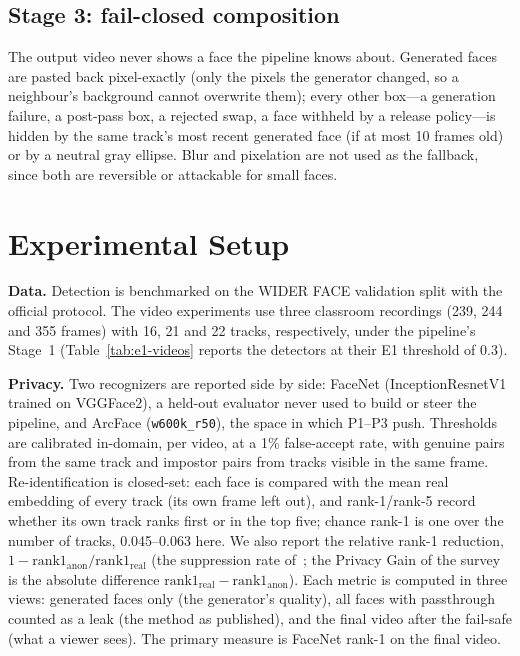 \subsection{Stage 3: fail-closed composition}

The output video never shows a face the pipeline knows about. Generated faces
are pasted back pixel-exactly (only the pixels the generator changed, so a
neighbour's background cannot overwrite them); every other box---a generation
failure, a post-pass box, a rejected swap, a face withheld by a release
policy---is hidden by the same track's most recent generated face (if at most 10
frames old) or by a neutral gray ellipse. Blur and pixelation are not used as
the fallback, since both are reversible or attackable for small faces.

\section{Experimental Setup}

\textbf{Data.} Detection is benchmarked on the WIDER FACE validation split with
the official protocol. The video experiments use three classroom recordings
(239, 244 and 355 frames) with 16, 21 and 22 tracks, respectively, under the
pipeline's Stage~1 (Table~\ref{tab:e1-videos} reports the detectors at their
E1 threshold of 0.3).

\textbf{Privacy.} Two recognizers are reported side by side: FaceNet
(InceptionResnetV1 trained on VGGFace2), a held-out evaluator never used to
build or steer the pipeline, and ArcFace (\texttt{w600k\_r50}), the space in
which P1--P3 push. Thresholds are calibrated in-domain, per video, at a 1\%
false-accept rate, with genuine pairs from the same track and impostor pairs
from tracks visible in the same frame. Re-identification is closed-set: each
face is compared with the mean real embedding of every track (its own frame
left out), and rank-1/rank-5 record whether its own track ranks first or in the
top five; chance rank-1 is one over the number of tracks, 0.045--0.063 here.
We also report the relative rank-1 reduction,
$1 - \mathrm{rank1}_{\mathrm{anon}} / \mathrm{rank1}_{\mathrm{real}}$ (the
suppression rate of~\cite{terhorst}; the Privacy Gain of the survey~\cite{meden}
is the absolute difference $\mathrm{rank1}_{\mathrm{real}} - \mathrm{rank1}_{\mathrm{anon}}$).
Each metric is computed in three views: generated faces only (the generator's
quality), all faces with passthrough counted as a leak (the method as
published), and the final video after the fail-safe (what a viewer sees). The
primary measure is FaceNet rank-1 on the final video.

